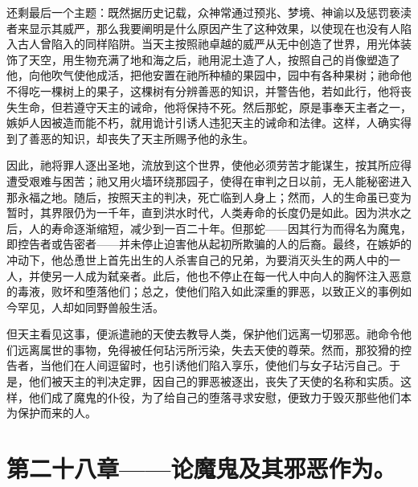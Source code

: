 还剩最后一个主题：既然据历史记载，众神常通过预兆、梦境、神谕以及惩罚亵渎者来显示其威严，那么我要阐明是什么原因产生了这种效果，以使现在也没有人陷入古人曾陷入的同样陷阱。当天主按照祂卓越的威严从无中创造了世界，用光体装饰了天空，用生物充满了地和海之后，祂用泥土造了人，按照自己的肖像塑造了他，向他吹气使他成活，把他安置在祂所种植的果园中，园中有各种果树；祂命他不得吃一棵树上的果子，这棵树有分辨善恶的知识，并警告他，若如此行，他将丧失生命，但若遵守天主的诫命，他将保持不死。然后那蛇，原是事奉天主者之一，嫉妒人因被造而能不朽，就用诡计引诱人违犯天主的诫命和法律。这样，人确实得到了善恶的知识，却丧失了天主所赐予他的永生。\par

因此，祂将罪人逐出圣地，流放到这个世界，使他必须劳苦才能谋生，按其所应得遭受艰难与困苦；祂又用火墙环绕那园子，使得在审判之日以前，无人能秘密进入那永福之地。随后，按照天主的判决，死亡临到人身上；然而，人的生命虽已变为暂时，其界限仍为一千年，直到洪水时代，人类寿命的长度仍是如此。因为洪水之后，人的寿命逐渐缩短，减少到一百二十年。但那蛇——因其行为而得名为魔鬼，即控告者或告密者——并未停止迫害他从起初所欺骗的人的后裔。最终，在嫉妒的冲动下，他怂恿世上首先出生的人杀害自己的兄弟，为要消灭头生的两人中的一人，并使另一人成为弑亲者。此后，他也不停止在每一代人中向人的胸怀注入恶意的毒液，败坏和堕落他们；总之，使他们陷入如此深重的罪恶，以致正义的事例如今罕见，人却如同野兽般生活。\par

但天主看见这事，便派遣祂的天使去教导人类，保护他们远离一切邪恶。祂命令他们远离属世的事物，免得被任何玷污所污染，失去天使的尊荣。然而，那狡猾的控告者，当他们在人间逗留时，也引诱他们陷入享乐，使他们与女子玷污自己。于是，他们被天主的判决定罪，因自己的罪恶被逐出，丧失了天使的名称和实质。这样，他们成了魔鬼的仆役，为了给自己的堕落寻求安慰，便致力于毁灭那些他们本为保护而来的人。\par


\section{第二十八章——论魔鬼及其邪恶作为。}

